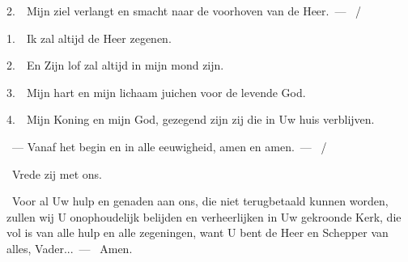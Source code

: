 \documentclass[12pt,twoside,a5paper]{article}
\begin{document}
\begin{halfparskip}
  2.~\dd~Mijn ziel verlangt en smacht naar de voorhoven van de Heer.~--- ~/ 
\end{halfparskip}

\vspace{0.5em}

\begin{halfparskip}

  1.~\dd~Ik zal altijd de Heer zegenen.

    

  2.~\dd~En Zijn lof zal altijd in mijn mond zijn.

    
\end{halfparskip}

\vspace{0.5em}

\begin{halfparskip}

  3.~\dd~Mijn hart en mijn lichaam juichen voor de levende God.

  4.~\dd~Mijn Koning en mijn God, gezegend zijn zij die in Uw huis verblijven.
\end{halfparskip}

\vspace{0.5em}

\begin{halfparskip}

  ~--- Vanaf het begin en in alle eeuwigheid, amen en amen.~--- ~/ 
\end{halfparskip}

\vspace{0.5em}

\begin{halfparskip}
  \dd~Vrede zij met ons.

  \cc~Voor al Uw hulp en genaden aan ons, die niet terugbetaald kunnen worden, zullen wij U onophoudelijk belijden en verheerlijken in Uw gekroonde Kerk, die vol is van alle hulp en alle zegeningen, want U bent de Heer en Schepper van alles, Vader...~--- \rr~Amen.
\end{halfparskip}
\end{document}
